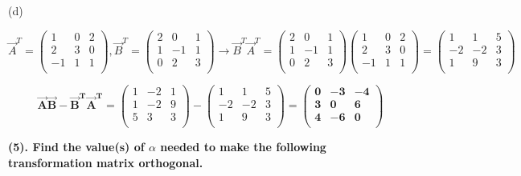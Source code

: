 \documentclass[12pt]{article}
\begin{document}
\hfill \break
(d)

$$
\vec{A}^T = 
\begin{pmatrix}
    1 & 0 & 2 \\
	2 & 3 & 0\\
	-1 & 1 & 1 \\
\end{pmatrix}
,
\vec{B}^T = 
\begin{pmatrix}
    2 & 0 & 1 \\
	1 & -1 & 1\\
	0 & 2 & 3 \\
\end{pmatrix} \rightarrow
\vec{B}^T\vec{A}^T =
\begin{pmatrix}
    2 & 0 & 1 \\
	1 & -1 & 1\\
	0 & 2 & 3 \\
\end{pmatrix}
\begin{pmatrix}
    1 & 0 & 2 \\
	2 & 3 & 0\\
	-1 & 1 & 1 \\
\end{pmatrix} =
\begin{pmatrix}
    1 & 1 & 5 \\
	-2 & -2 & 3\\
	1 & 9 & 3 \\
\end{pmatrix}
$$

$$
\boldsymbol{\vec{A}\vec{B} - \vec{B}^T\vec{A}^T} = 
\begin{pmatrix}
    1 & -2 & 1 \\
	1 & -2 & 9\\
	5 & 3 & 3 \\
\end{pmatrix} -
\begin{pmatrix}
    1 & 1 & 5 \\
	-2 & -2 & 3\\
	1 & 9 & 3 \\
\end{pmatrix} = 
\boldsymbol{
\begin{pmatrix}
    0 & -3 & -4 \\
	3 & 0 & 6\\
	4 & -6 & 0 \\
\end{pmatrix}
}
$$

\newpage
\textbf{(5). Find the value(s) of $\alpha$ needed to make the following transformation matrix
orthogonal.}
\end{document}
